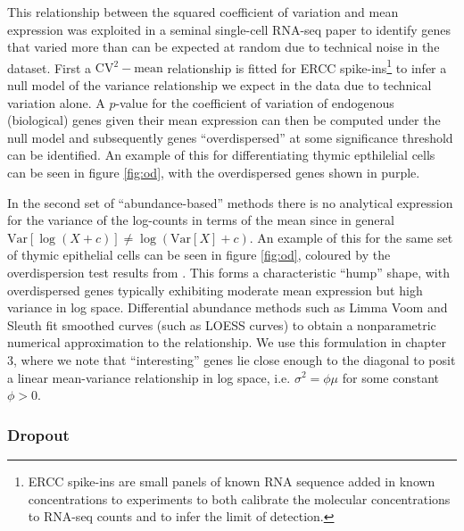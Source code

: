 This relationship between the squared coefficient of variation and mean expression was exploited in a seminal single-cell RNA-seq paper \cite{Brennecke2013-xy} to identify genes that varied more than can be expected at random due to technical noise in the dataset. First a $\text{CV}^2-\text{mean}$ relationship is fitted for ERCC spike-ins\footnote{
ERCC spike-ins are small panels of known RNA sequence added in known concentrations to experiments to both calibrate the molecular concentrations to RNA-seq counts and to infer the limit of detection.
} to infer a null model of the variance relationship we expect in the data due to technical variation alone. A $p$-value for the coefficient of variation of endogenous (biological) genes given their mean expression can then be computed under the null model and subsequently genes ``overdispersed'' at some significance threshold can be identified. An example of this for differentiating thymic epthilelial cells can be seen in figure \ref{fig:od}, with the overdispersed genes shown in purple.

In the second set of ``abundance-based'' methods there is no analytical expression for the variance of the log-counts in terms of the mean since in general $\text{Var}[\log(X + c)] \neq \log(\text{Var}[X] + c)$. An example of this for the same set of thymic epithelial cells can be seen in figure \ref{fig:od}, coloured by the overdispersion test results from \cite{Brennecke2013-xy}. This forms a characteristic ``hump'' shape, with overdispersed genes typically exhibiting moderate mean expression but high variance in log space. Differential abundance methods such as Limma Voom \cite{Law2014-tu} and Sleuth \cite{Pimentel2016-xz} fit smoothed curves (such as LOESS curves) to obtain a nonparametric numerical approximation to the relationship. We use this formulation in chapter 3, where we note that ``interesting'' genes lie close enough to the diagonal to posit a linear mean-variance relationship in log space, i.e. $\sigma^2 = \phi \mu$ for some constant $\phi > 0$.

\subsubsection{Dropout} \label{sec:intro_dropout}

